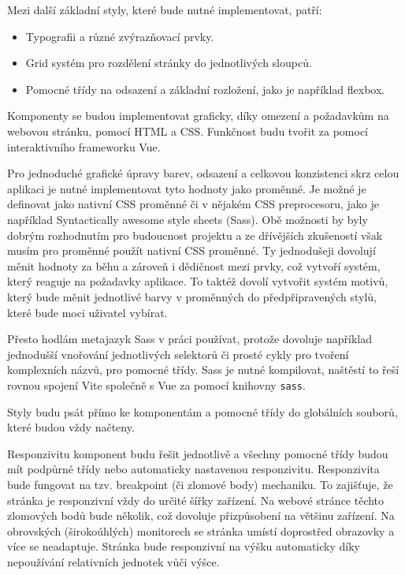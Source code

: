 Mezi další základní styly, které bude nutné implementovat, patří:

\begin{itemize}
    \item Typografii a různé zvýrazňovací prvky.
    \item Grid systém pro rozdělení stránky do jednotlivých sloupců.
    \item Pomocné třídy na odsazení a základní rozložení, jako je například flexbox.
\end{itemize}

Komponenty se budou implementovat graficky, díky omezení a požadavkům na webovou stránku, pomocí HTML a CSS.
Funkčnost budu tvořit za pomocí interaktivního frameworku Vue.

Pro jednoduché grafické úpravy barev, odsazení a celkovou konzistenci skrz celou aplikaci je nutné implementovat tyto hodnoty jako proměnné.
Je možné je definovat jako nativní CSS proměnné či v nějakém CSS preprocesoru, jako je například Syntactically awesome style sheets (Sass).
Obě možnosti by byly dobrým rozhodnutím pro budoucnost projektu a ze dřívějších zkušeností však musím pro proměnné použít nativní CSS proměnné.
Ty jednodušeji dovolují měnit hodnoty za běhu a zároveň i dědičnost mezi prvky, což vytvoří systém, který reaguje na požadavky aplikace.
To taktéž dovolí vytvořit systém motivů, který bude měnit jednotlivé barvy v proměnných do předpřipravených stylů, které bude moci uživatel vybírat.

Přesto hodlám metajazyk Sass v práci používat, protože dovoluje například jednodušší vnořování jednotlivých selektorů či prosté cykly pro tvoření komplexních názvů, pro pomocné třídy.
Sass je nutné kompilovat, naštěstí to řeší rovnou spojení Vite společně s Vue za pomocí knihovny \texttt{sass}.

Styly budu psát přímo ke komponentám a pomocné třídy do globálních souborů, které budou vždy načteny.

Responzivitu komponent budu řešit jednotlivě a všechny pomocné třídy budou mít podpůrné třídy nebo automaticky nastavenou responzivitu.
Responzivita bude fungovat na tzv. breakpoint (či zlomové body) mechaniku.
To zajišťuje, že stránka je responzivní vždy do určité šířky zařízení.
Na webové stránce těchto zlomových bodů bude několik, což dovoluje přizpůsobení na většinu zařízení.
Na obrovských (širokoúhlých) monitorech se stránka umístí doprostřed obrazovky a více se neadaptuje.
Stránka bude responzivní na výšku automaticky díky nepoužívání relativních jednotek vůči výšce.

